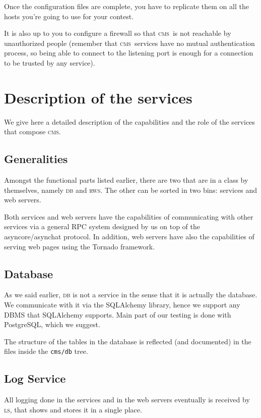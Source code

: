\documentclass[a4paper,8pt]{amsart}
\newcommand{\CMS}{\textsc{cms}}
\newcommand{\DB}{\textsc{db}}
\newcommand{\LS}{\textsc{ls}}
\newcommand{\RWS}{\textsc{rws}}
\newcommand{\file}[1]{\texttt{#1}}
\begin{document}
\begin{multicols}{2}
  Once the configuration files are complete, you have to replicate
  them on all the hosts you're going to use for your contest.

  It is also up to you to configure a firewall so that \CMS\ is not
  reachable by unauthorized people (remember that \CMS\ services have
  no mutual authentication process, so being able to connect to the
  listening port is enough for a connection to be trusted by any
  service).

  \section{Description of the services}

  We give here a detailed description of the capabilities and the role
  of the services that compose \CMS{}.

  \subsection{Generalities}

  Amongst the functional parts listed earlier, there are two that are
  in a class by themselves, namely \DB{} and \RWS{}. The other can be
  sorted in two bins: services and web servers.

  Both services and web servers have the capabilities of communicating
  with other services via a general RPC system designed by us on top
  of the asyncore/asynchat protocol. In addition, web servers have
  also the capabilities of serving web pages using the Tornado
  framework.

  \subsection{Database}

  As we said earlier, \DB{} is not a service in the sense that it is
  actually the database. We communicate with it via the SQLAlchemy
  library, hence we support any DBMS that SQLAlchemy supports. Main
  part of our testing is done with PostgreSQL, which we suggest.

  The structure of the tables in the database is reflected (and
  documented) in the files inside the \file{cms/db} tree.

  \subsection{Log Service}

  All logging done in the services and in the web servers eventually
  is received by \LS{}, that shows and stores it in a single place.


\end{multicols}
\end{document}
